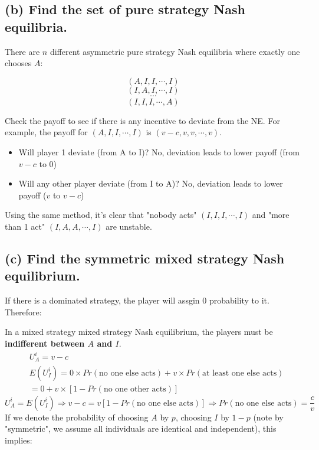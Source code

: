 \documentclass{article}
\begin{document}
%
\subsection*{(b) Find the set of pure strategy Nash equilibria. } 

There are $n$ different asymmetric pure strategy Nash equilibria where exactly one chooses $A$:

$$(A,I,I,\cdots,I)$$
$$(I,A,I,\cdots,I)$$
$$\cdots$$
$$(I,I,I,\cdots,A)$$

\begin{mdframed}[backgroundcolor=blue!20,linecolor=white]

Check the payoff to see if there is any incentive to deviate from the NE. For example, the payoff for
$(A,I,I,\cdots,I)$ is $(v-c,v,v,\cdots,v)$.

\begin{itemize}
\item Will player 1 deviate (from A to I)? No, deviation leads to lower payoff (from $v-c$ to $0$)
\item Will any other player deviate (from I to A)? No, deviation leads to lower payoff ($v$ to $v-c$)
\end{itemize}

Using the same method, it's clear that "nobody acts" $(I,I,I,\cdots,I)$ and "more than 1 act" $(I,A,A,\cdots,I)$ are
unstable.
\end{mdframed}


\subsection*{(c) Find the symmetric mixed strategy Nash equilibrium.}

\begin{mdframed}[backgroundcolor=blue!20,linecolor=white]
If there is a dominated strategy, the player will assgin 0 probability to it. Therefore:
\end{mdframed}

In a mixed strategy mixed strategy Nash equilibrium, the players must be \textbf{indifferent between $A$ and $I$}.
\begin{align*}
& U^i_A = v-c \\  
&E(U^i_I) = 0 \times Pr(\text{no one else acts}) + v \times  Pr(\text{at least one else acts}) \\
&= 0 + v \times [1- Pr(\text{no one other acts})]
\end{align*}
$$U^i_A = E(U^i_I) \Rightarrow v-c = v [1- Pr(\text{no one else acts})]\Rightarrow Pr(\text{no one else acts}) = \frac{c}{v}$$
If we denote the probability of choosing $A$ by $p$, choosing $I$ by $1-p$ (note by "symmetric", we assume all individuals are identical and independent), 
this implies:
\end{document}
